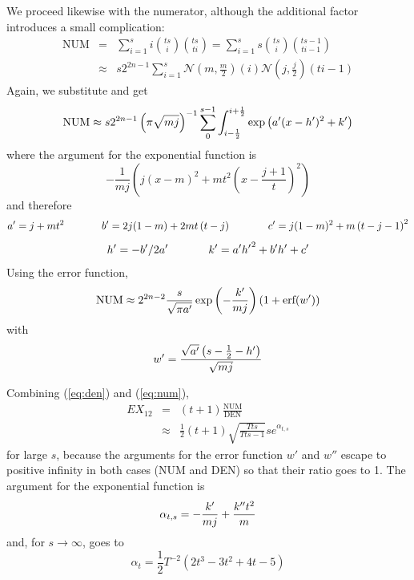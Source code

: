 \documentclass[12pt]{article}
\begin{document}
We proceed likewise with the numerator, although the additional factor
introduces a small complication:
  \begin{eqnarray*}
  \mbox{NUM}&=&\sum_{i=1}^{s}i\binom{ts}{i}\binom{ts}{ti}=\sum_{i=1}^{s}s\binom{ts}{i}\binom{ts-1}{ti-1}\\
&\approx&s2^{2n-1}\sum_{i=1}^{s}\mathcal{N}\left(m,\frac{m}{2}\right)(i)\mathcal{N}\left(j,\frac{j}{2}\right)(ti-1)
\end{eqnarray*}
Again, we substitute and get
\begin{displaymath}
  \mbox{NUM}\approx{}s2^{2n-1}\left(\pi\sqrt{mj}\right)^{-1}\sum_{0}^{s-1}\int_{i-\frac{1}{2}}^{i+\frac{1}{2}}\exp\left({a'}(x-{h'})^{2}+{k'}\right)
\end{displaymath}
where the argument for the exponential function is
\begin{displaymath}
  -\frac{1}{mj}\left(j(x-m)^{2}+mt^{2}\left(x-\frac{j+1}{t}\right)^{2}\right)
\end{displaymath}
and therefore
\begin{displaymath}
{a'}=j+mt^{2}\hspace{.5in}
{b'}=2j(1-m)+2mt\left(t-j\right)\hspace{.5in}
{c'}=j(1-m)^{2}+m\left(t-j-1\right)^{2}
\end{displaymath}
\begin{displaymath}
{h'}=-{b'}/2{a'}\hspace{.5in}
{k'}={a'}{h'}^{2}+{b'}{h'}+{c'}
\end{displaymath}
Using the error function, 
\begin{equation}
  \label{eq:num}
  \mbox{NUM}\approx{}2^{2n-2}\frac{s}{\sqrt{\pi{}{a'}}}\exp\left(-\frac{{k'}}{mj}\right)\left(1+\mbox{erf}({w'})\right)
\end{equation}
with
\begin{displaymath}
  {w'}=\frac{\sqrt{{a'}}\left(s-\frac{1}{2}-{h'}\right)}{\sqrt{mj}}
\end{displaymath}

Combining ({\ref{eq:den}}) and ({\ref{eq:num}}),
\begin{eqnarray*}
  EX_{12}&=&(t+1)\frac{\mbox{NUM}}{\mbox{DEN}}\\
&\approx&\frac{1}{2}(t+1)\sqrt{\frac{{T}{}ts}{{T}{}ts-1}}se^{\alpha_{t,s}}
\end{eqnarray*}
for large $s$, because the arguments for the error function $w'$ and
$w''$ escape to positive infinity in both cases (NUM and DEN) so that
their ratio goes to 1. The argument for the exponential function is
\begin{displaymath}
  \alpha_{t,s}=-\frac{{k'}}{mj}+\frac{{k''}t^{2}}{m}
\end{displaymath}
and, for $s\rightarrow\infty$, goes to
\begin{displaymath}
  \alpha_{t}=\frac{1}{2}{T}^{-2}(2t^{3}-3t^{2}+4t-5)
\end{displaymath}
\end{document}
